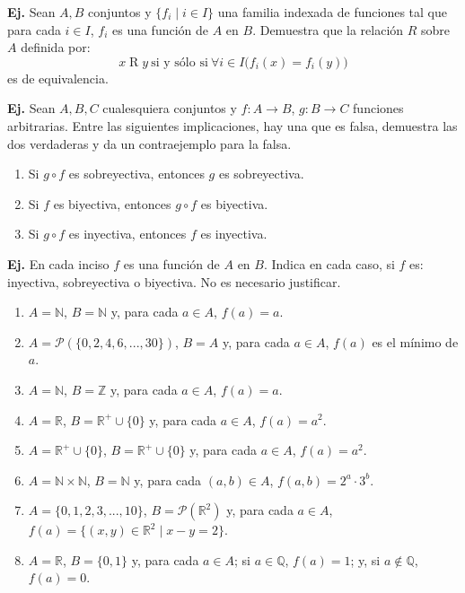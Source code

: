 \documentclass[letterpaper,DIV=14,headsepline,12pt]{scrartcl}
\providecommand\st{\;|\;}
\newcounter{Ejer}
\newcommand{\pts}{}
\newenvironment{ejercicio}[1]{\noindent
    \ifthenelse{\equal{#1}{1}}{\renewcommand{\pts}{\textbf{(#1 pt)}}}{\renewcommand{\pts}{\textbf{(#1 pts)}}}\textbf{Ej. \theEjer} \pts\stepcounter{Ejer}}{\vspace{.3cm}}
\begin{document}
    \begin{ejercicio}{1}
        Sean $A,B$ conjuntos y $\{f_i \st i\in I\}$ una familia indexada de funciones tal que para cada $i \in I$, $f_i$ es una función de $A$ en $B$. Demuestra que la relación $R$ sobre $A$ definida por:
        \[ x \mathrel{R} y \: \text{si y sólo si} \: \forall i \in I \big( f_i(x)=f_i(y) \big) \]
        es de equivalencia.
    \end{ejercicio}

    \begin{ejercicio}{1}
        Sean $A,B,C$ cualesquiera conjuntos y $f:A \to B$, $g:B \to C$ funciones arbitrarias. Entre las siguientes implicaciones, hay una que es falsa, demuestra las dos verdaderas y da un contraejemplo para la falsa.
        \begin{enumerate}
            \item Si $g \circ f$ es sobreyectiva, entonces $g$ es sobreyectiva.
            \item Si $f$ es biyectiva, entonces $g \circ f$ es biyectiva.
            \item Si $g \circ f$ es inyectiva, entonces $f$ es inyectiva.
        \end{enumerate}
    \end{ejercicio}

    \begin{ejercicio}{1}
        En cada inciso $f$ es una función de $A$ en $B$. Indica en cada caso, si $f$ es: inyectiva, sobreyectiva o biyectiva. No es necesario justificar.
        \begin{enumerate}
            \item $A=\mathbb{N}$, $B=\mathbb{N}$ y, para cada $a \in A$, $f(a)=a$.
            \item $A=\mathscr{P}(\{0,2,4,6,...,30\})$, $B=A$ y, para cada $a \in A$, $f(a)$ es el mínimo de $a$.
            \item $A=\mathbb{N}$, $B=\mathbb{Z}$ y, para cada $a \in A$, $f(a)=a$.
            \item $A=\mathbb{R}$, $B=\mathbb{R}^+ \cup \{0\}$ y, para cada $a \in A$, $f(a)=a^2$.
            \item $A=\mathbb{R}^+\cup\{0\}$, $B=\mathbb{R}^+ \cup \{0\}$ y, para cada $a \in A$, $f(a)=a^2$.
            \item $A=\mathbb{N} \times \mathbb{N}$, $B=\mathbb{N}$ y, para cada $(a,b)\in A$, $f(a,b)=2^a \cdot 3^b$.
            \item $A=\{0,1,2,3,...,10\}$, $B=\mathscr{P}(\mathbb{R}^2)$ y, para cada $a \in A$, $f(a)=\{(x,y) \in \mathbb{R}^2 \st x-y=2\}$.
            \item $A=\mathbb{R}$, $B=\{0,1\}$ y, para cada $a \in A$; si $a \in \mathbb{Q}$, $f(a)=1$; y, si $a \notin \mathbb{Q}$, $f(a)=0$.
        \end{enumerate}
    \end{ejercicio}
\end{document}
